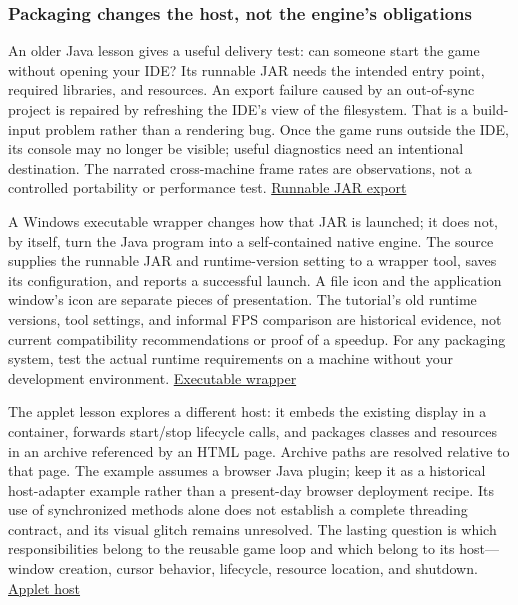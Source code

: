 \subsubsection{Packaging changes the host, not the engine's obligations}\label{packaging-changes-the-host-not-the-engines-obligations}

An older Java lesson gives a useful delivery test: can someone start the game without opening your IDE? Its runnable JAR needs the intended entry point, required libraries, and resources. An export failure caused by an out-of-sync project is repaired by refreshing the IDE's view of the filesystem. That is a build-input problem rather than a rendering bug. Once the game runs outside the IDE, its console may no longer be visible; useful diagnostics need an intentional destination. The narrated cross-machine frame rates are observations, not a controlled portability or performance test. \href{https://www.youtube.com/watch?v=velhSXA2CnQ}{Runnable JAR export}

A Windows executable wrapper changes how that JAR is launched; it does not, by itself, turn the Java program into a self-contained native engine. The source supplies the runnable JAR and runtime-version setting to a wrapper tool, saves its configuration, and reports a successful launch. A file icon and the application window's icon are separate pieces of presentation. The tutorial's old runtime versions, tool settings, and informal FPS comparison are historical evidence, not current compatibility recommendations or proof of a speedup. For any packaging system, test the actual runtime requirements on a machine without your development environment. \href{https://www.youtube.com/watch?v=ucW3mBoTyTw}{Executable wrapper}

The applet lesson explores a different host: it embeds the existing display in a container, forwards start/stop lifecycle calls, and packages classes and resources in an archive referenced by an HTML page. Archive paths are resolved relative to that page. The example assumes a browser Java plugin; keep it as a historical host-adapter example rather than a present-day browser deployment recipe. Its use of synchronized methods alone does not establish a complete threading contract, and its visual glitch remains unresolved. The lasting question is which responsibilities belong to the reusable game loop and which belong to its host---window creation, cursor behavior, lifecycle, resource location, and shutdown. \href{https://www.youtube.com/watch?v=WkBMoCbbgO0}{Applet host}


